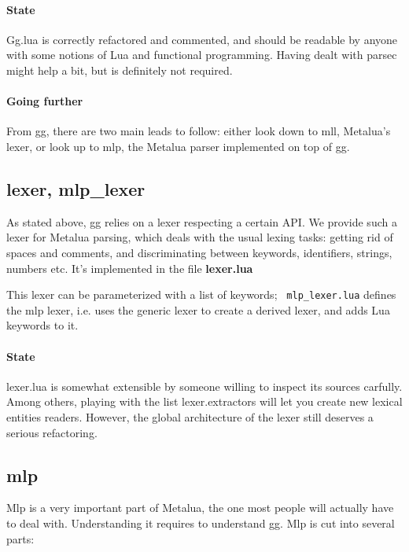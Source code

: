 \paragraph{State} 
Gg.lua is correctly refactored and commented, and should be readable
by anyone with some notions of Lua and functional programming. Having
dealt with parsec might help a bit, but is definitely not required.

\paragraph{Going further} 
From gg, there are two main leads to follow: either look down to mll,
Metalua's lexer, or look up to mlp, the Metalua parser implemented on
top of gg.

\subsection{lexer, mlp\_lexer}

As stated above, gg relies on a lexer respecting a certain API. We
provide such a lexer for Metalua parsing, which deals with the usual
lexing tasks: getting rid of spaces and comments, and discriminating
between keywords, identifiers, strings, numbers etc. It's implemented
in the file {\bf lexer.lua}

This lexer can be parameterized with a list of keywords; {\tt
  mlp\_lexer.lua} defines the mlp lexer, i.e. uses the generic lexer to
create a derived lexer, and adds Lua keywords to it. 

\paragraph{State}
lexer.lua is somewhat extensible by someone willing to inspect its
sources carfully. Among others, playing with the list lexer.extractors
will let you create new lexical entities readers. However, the global
architecture of the lexer still deserves a serious refactoring.

\subsection{mlp}
Mlp is a very important part of Metalua, the one most people will
actually have to deal with. Understanding it requires to understand
gg. Mlp is cut into several parts:

